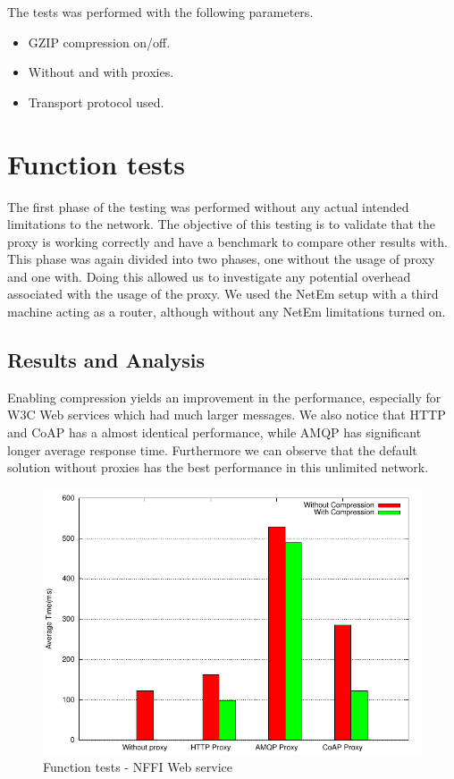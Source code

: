 The tests was performed with the following parameters.

\begin{itemize}
	\item GZIP compression on/off.
	\item Without and with proxies.
    \item Transport protocol used.
\end{itemize}


\section{Function tests}

The first phase of the testing was performed without any actual intended
limitations to the network. The objective of this testing is to validate that
the proxy is working correctly and have a benchmark to compare other results
with. This phase was again divided into two phases, one without the usage of
proxy and one with. Doing this allowed us to investigate any potential
overhead associated with the usage of the proxy. We used the NetEm setup with
a third machine acting as a router, although without any NetEm limitations
turned on.


\subsection{Results and Analysis}

Enabling compression yields an improvement in the performance, especially for
W3C Web services which had much larger messages. We also notice that HTTP and
CoAP has a almost identical performance, while AMQP has significant longer
average response time. Furthermore we can observe that the default solution
without proxies has the best performance in this unlimited network.

\begin{figure}[H]
\center
\includegraphics[scale=0.75]{../results/function_tests/nffi/result.pdf}
\caption{Function tests - NFFI Web service}
\end{figure}

